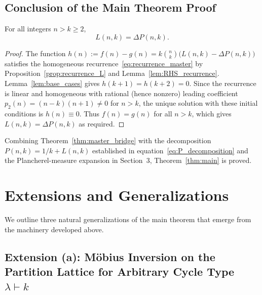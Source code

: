 \subsection{Conclusion of the Main Theorem Proof}

\begin{theorem}\label{thm:master_bridge}
For all integers $n>k\ge 2$,
\[
  L(n,k) = \Delta P(n,k).
\]
\end{theorem}
\begin{proof}
The function $h(n):=f(n)-g(n)=k\binom{n}{k}\bigl(L(n,k)-\Delta P(n,k)\bigr)$
satisfies the homogeneous recurrence~\eqref{eq:recurrence_master} by
Proposition~\ref{prop:recurrence_L} and Lemma~\ref{lem:RHS_recurrence}.
Lemma~\ref{lem:base_cases} gives $h(k+1)=h(k+2)=0$.  Since the recurrence is
linear and homogeneous with rational (hence nonzero) leading coefficient
$p_2(n)=(n-k)(n+1)\ne0$ for $n>k$, the unique solution with these initial
conditions is $h(n)\equiv 0$.  Thus $f(n)=g(n)$ for all $n>k$, which gives
$L(n,k)=\Delta P(n,k)$ as required.
\end{proof}

\begin{corollary}\label{cor:main_complete}
Combining Theorem~\ref{thm:master_bridge} with the decomposition
$P(n,k)=1/k+L(n,k)$ established in equation~\eqref{eq:P_decomposition} and
the Plancherel-measure expansion in Section~3, Theorem~\ref{thm:main} is
proved.
\end{corollary}

\section{Extensions and Generalizations}
\label{sec:extensions}

We outline three natural generalizations of the main theorem that emerge from
the machinery developed above.

\subsection{Extension (a): Möbius Inversion on the Partition Lattice for
  Arbitrary Cycle Type \texorpdfstring{$\lambda\vdash k$}{λ⊢k}}

